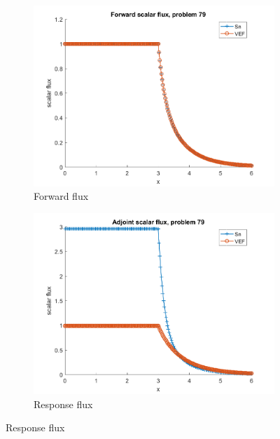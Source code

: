 \documentclass{article}
\begin{document}
\begin{figure}[H]
\label{Case79Flux}
\centering
\begin{subfigure}{.5\textwidth}
  \centering
  \includegraphics[width=.98\linewidth]{IanProposal/figures2/79phi.png}
  \caption{Forward flux}
  \label{fig:sfig1}
\end{subfigure}%
\begin{subfigure}{.5\textwidth}
  \centering
  \includegraphics[width=.98\linewidth]{IanProposal/figures2/79phia.png}
  \caption{Response flux}
  \label{fig:sfig4}
\end{subfigure}%
\end{figure}
\end{document}
